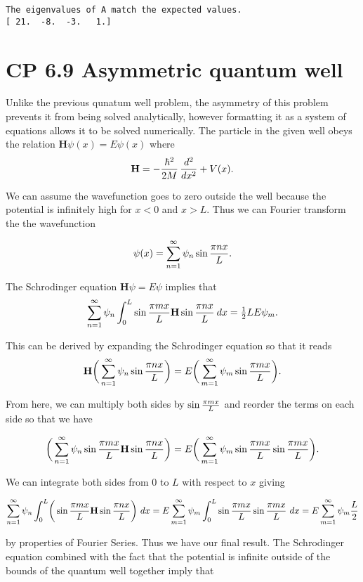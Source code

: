 \documentclass[11pt]{article}
\begin{document}
    \begin{Verbatim}[commandchars=\\\{\}]
The eigenvalues of A match the expected values.
[ 21.  -8.  -3.   1.]

    \end{Verbatim}

    \section{CP 6.9 Asymmetric quantum
well}\label{cp-6.9-asymmetric-quantum-well}

Unlike the previous qunatum well problem, the asymmetry of this problem
prevents it from being solved analytically, however formatting it as a
system of equations allows it to be solved numerically. The particle in
the given well obeys the relation \(\mathbf{H}\psi(x) = E\psi(x)\) where
\[\mathbf{H} = - {\hbar^2\over2M}\,{d^2\over d x^2} + V(x).\]

We can assume the wavefunction goes to zero outside the well because the
potential is infinitely high for \(x<0\) and \(x>L.\) Thus we can
Fourier transform the the wavefunction

\[\psi(x) = \sum_{n=1}^\infty \psi_n \sin {\pi n x\over L}.\]

The Schrodinger equation \(\mathbf{H}\psi = E\psi\) implies that
\[\sum_{n=1}^\infty \psi_n \int_0^L \sin{\pi m x\over L} \mathbf{H}\sin{\pi n x\over L} \> d x = \tfrac12 L E \psi_m.\]

    This can be derived by expanding the Schrodinger equation so that it
reads
\[\mathbf{H}\biggr(\sum_{n=1}^\infty \psi_n \sin {\pi n x\over L}\biggr) = E\biggr(\sum_{m=1}^\infty \psi_m \sin {\pi m x\over L}\biggr).\]

From here, we can multiply both sides by \(\sin{\pi m x \over L}\) and
reorder the terms on each side so that we have

\[\biggr(\sum_{n=1}^\infty \psi_n \sin {\pi m x\over L} \mathbf{H} \sin {\pi n x\over L}\biggr) = E\biggr(\sum_{m=1}^\infty \psi_m \sin {\pi m x\over L}\sin {\pi m x\over L}\biggr).\]

We can integrate both sides from \(0\) to \(L\) with respect to \(x\)
giving

\[\sum_{n=1}^\infty \psi_n \int_0^L \biggr(\sin {\pi m x\over L} \mathbf{H} \sin {\pi n x\over L}\biggr)\ dx = E \sum_{m=1}^\infty \psi_m \int_0^L \sin {\pi m x\over L}\sin {\pi m x\over L}\ dx = E \sum_{m=1}^\infty \psi_m {L \over 2}\]

by properties of Fourier Series. Thus we have our final result. The
Schrodinger equation combined with the fact that the potential is
infinite outside of the bounds of the quantum well together imply that
\end{document}
